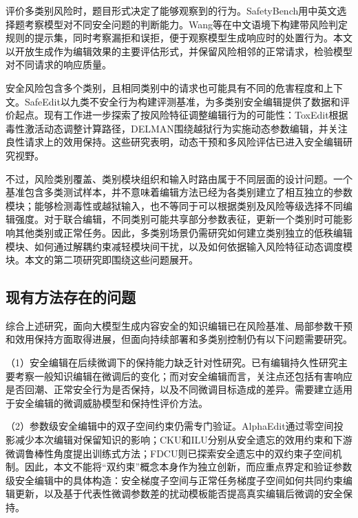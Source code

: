 评价多类别风险时，题目形式决定了能够观察到的行为。SafetyBench用中英文选择题考察模型对不同安全问题的判断能力\cite{zhang2024safetybench}。Wang等在中文语境下构建带风险判定规则的提示集，同时考察漏拒和误拒，便于观察模型生成响应时的处置行为\cite{wang2024chineseguard}。本文以开放生成作为编辑效果的主要评估形式，并保留风险相邻的正常请求，检验模型对不同请求的响应质量。

安全风险包含多个类别，且相同类别中的请求也可能具有不同的危害程度和上下文。SafeEdit以九类不安全行为构建评测基准，为多类别安全编辑提供了数据和评价起点\cite{wang2024safeedit}。现有工作进一步探索了按风险特征调整编辑行为的可能性：ToxEdit根据毒性激活动态调整计算路径\cite{lu2025toxedit}，DELMAN围绕越狱行为实施动态参数编辑，并关注良性请求上的效用保持\cite{wang2025delman}。这些研究表明，动态干预和多风险评估已进入安全编辑研究视野。

不过，风险类别覆盖、类别模块组织和输入时路由属于不同层面的设计问题。一个基准包含多类测试样本，并不意味着编辑方法已经为各类别建立了相互独立的参数模块；能够检测毒性或越狱输入，也不等同于可以根据类别及风险等级选择不同编辑强度。对于联合编辑，不同类别可能共享部分参数表征，更新一个类别时可能影响其他类别或正常任务。因此，多类别场景仍需研究如何建立类别独立的低秩编辑模块、如何通过解耦约束减轻模块间干扰，以及如何依据输入风险特征动态调度模块。本文的第二项研究即围绕这些问题展开。

\subsection{现有方法存在的问题}

综合上述研究，面向大模型生成内容安全的知识编辑已在风险基准、局部参数干预和效用保持方面取得进展，但面向持续部署和多类别控制仍有以下问题需要研究。

（1）安全编辑在后续微调下的保持能力缺乏针对性研究。已有编辑持久性研究主要考察一般知识编辑在微调后的变化\cite{cheng2025finetune}；而对安全编辑而言，关注点还包括有害响应是否回潮、正常安全行为是否保持，以及不同微调目标造成的差异。需要建立适用于安全编辑的微调威胁模型和保持性评价方法。

（2）参数级安全编辑中的双子空间约束仍需专门验证。AlphaEdit通过零空间投影减少本次编辑对保留知识的影响\cite{fang2024alphaedit}；CKU和ILU分别从安全遗忘的效用约束和下游微调鲁棒性角度提出训练式方法\cite{shi2025cku,wang2025ilu}；FDCU则已探索安全遗忘中的双约束子空间机制\cite{li2026fdcu}。因此，本文不能将“双约束”概念本身作为独立创新，而应重点界定和验证参数级安全编辑中的具体构造：安全梯度子空间与正常任务梯度子空间如何共同约束编辑更新，以及基于代表性微调参数差的扰动模板能否提高真实编辑后微调的安全保持。

